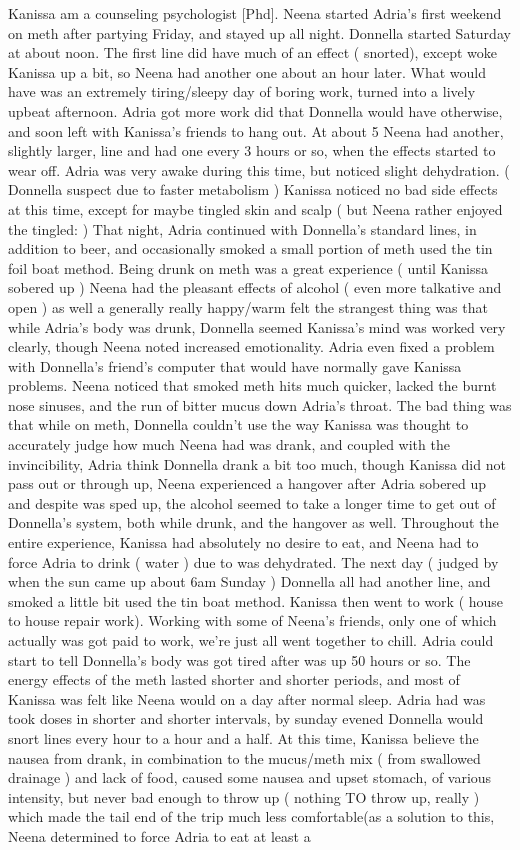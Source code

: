 \documentclass[12pt]{book}
\begin{document}
Kanissa am a counseling psychologist [Phd]. Neena started Adria's first weekend on meth after partying Friday, and stayed up all night. Donnella started Saturday at about noon. The first line did have much of an effect ( snorted), except woke Kanissa up a bit, so Neena had another one about an hour later. What would have was an extremely tiring/sleepy day of boring work, turned into a lively upbeat afternoon. Adria got more work did that Donnella would have otherwise, and soon left with Kanissa's friends to hang out. At about 5 Neena had another, slightly larger, line and had one every 3 hours or so, when the effects started to wear off. Adria was very awake during this time, but noticed slight dehydration. ( Donnella suspect due to faster metabolism ) Kanissa noticed no bad side effects at this time, except for maybe tingled skin and scalp ( but Neena rather enjoyed the tingled: ) That night, Adria continued with Donnella's standard lines, in addition to beer, and occasionally smoked a small portion of meth used the tin foil boat method. Being drunk on meth was a great experience ( until Kanissa sobered up ) Neena had the pleasant effects of alcohol ( even more talkative and open ) as well a generally really happy/warm felt the strangest thing was that while Adria's body was drunk, Donnella seemed Kanissa's mind was worked very clearly, though Neena noted increased emotionality. Adria even fixed a problem with Donnella's friend's computer that would have normally gave Kanissa problems. Neena noticed that smoked meth hits much quicker, lacked the burnt nose sinuses, and the run of bitter mucus down Adria's throat. The bad thing was that while on meth, Donnella couldn't use the way Kanissa was thought to accurately judge how much Neena had was drank, and coupled with the invincibility, Adria think Donnella drank a bit too much, though Kanissa did not pass out or through up, Neena experienced a hangover after Adria sobered up and despite was sped up, the alcohol seemed to take a longer time to get out of Donnella's system, both while drunk, and the hangover as well. Throughout the entire experience, Kanissa had absolutely no desire to eat, and Neena had to force Adria to drink ( water ) due to was dehydrated. The next day ( judged by when the sun came up about 6am Sunday ) Donnella all had another line, and smoked a little bit used the tin boat method. Kanissa then went to work ( house to house repair work). Working with some of Neena's friends, only one of which actually was got paid to work, we're just all went together to chill. Adria could start to tell Donnella's body was got tired after was up 50 hours or so. The energy effects of the meth lasted shorter and shorter periods, and most of Kanissa was felt like Neena would on a day after normal sleep. Adria had was took doses in shorter and shorter intervals, by sunday evened Donnella would snort lines every hour to a hour and a half. At this time, Kanissa believe the nausea from drank, in combination to the mucus/meth mix ( from swallowed drainage ) and lack of food, caused some nausea and upset stomach, of various intensity, but never bad enough to throw up ( nothing TO throw up, really ) which made the tail end of the trip much less comfortable(as a solution to this, Neena determined to force Adria to eat at least a 
\end{document}
